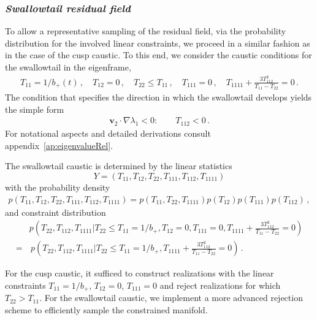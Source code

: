 \documentclass[a4paper, 11pt]{article}
\begin{document}
\subsubsection{{\it Swallowtail residual field}}
To allow a representative sampling of the residual field, via the probability distribution for the involved linear constraints, we proceed in a similar fashion as in the case of the cusp caustic. To this end, we consider the caustic conditions for the swallowtail in the eigenframe,
\begin{align}
T_{11}=1/b_+(t)\,, \quad T_{12}=0\,,\quad T_{22}\leq T_{11}\,,\quad T_{111}=0\,, \quad T_{1111}+\frac{3T_{112}^2}{T_{11}-T_{22}} =0\,.
\end{align}
The condition that specifies the direction in which the swallowtail develops yields the simple form 
\begin{align}
\bm{v}_2 \cdot \nabla \lambda_1  <0: \qquad T_{112} <0\,.
\end{align}
For notational aspects and detailed derivations consult appendix~\ref{ap:eigenvalueRel}.

\bigskip
\noindent The swallowtail caustic is determined by the linear statistics
\begin{equation}
  Y=(T_{11},T_{12},T_{22},T_{111},T_{112},T_{1111})
\end{equation}
with the probability density
\begin{align}
p(T_{11},T_{12},T_{22},T_{111},T_{112},T_{1111})=p(T_{11},T_{22},T_{1111})p(T_{12})p(T_{111})p(T_{112})\,,
\end{align}
and constraint distribution 
\begin{align}
&p\left(T_{22},T_{112},T_{1111}|T_{22}\leq T_{11}=1/b_+, T_{12}=0,T_{111}=0,T_{1111}+\frac{3T_{112}^2}{T_{11}-T_{22}}=0\right)\nonumber\\
=&\, p\left(T_{22},T_{112}, T_{1111}|T_{22}\leq T_{11}=1/b_+, T_{1111}+\frac{3T_{112}^2}{T_{11}-T_{22}}=0\right)\,.
\end{align}


\bigskip
\noindent For the cusp caustic, it sufficed to construct realizations with the linear constraints $T_{11}=1/b_+$, $T_{12}=0$, $T_{111}=0$ and reject realizations for which $T_{22} > T_{11}$. For the swallowtail caustic, we implement a more advanced rejection scheme to efficiently sample the constrained manifold.
\end{document}
